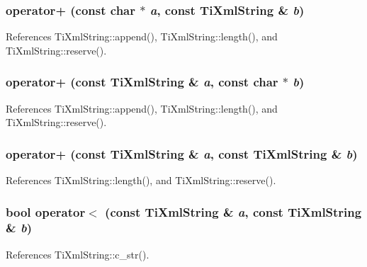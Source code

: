\subsubsection[operator+]{ operator+ (const char $\ast$ {\em a}, \/  const {\bf TiXmlString} \& {\em b})}\label{tinystr_8h_c0f2988a051a761664d80de81462fc4d}




References TiXmlString::append(), TiXmlString::length(), and TiXmlString::reserve().
\subsubsection[operator+]{ operator+ (const {\bf TiXmlString} \& {\em a}, \/  const char $\ast$ {\em b})}\label{tinystr_8h_b77ef9617d62643b24e52118db159b7b}




References TiXmlString::append(), TiXmlString::length(), and TiXmlString::reserve().
\subsubsection[operator+]{ operator+ (const {\bf TiXmlString} \& {\em a}, \/  const {\bf TiXmlString} \& {\em b})}\label{tinystr_8h_6ee35bce93b3aaf8a2353471c0dd2d58}




References TiXmlString::length(), and TiXmlString::reserve().
\subsubsection[operator$<$]{\setlength{\rightskip}{0pt plus 5cm}bool operator$<$ (const {\bf TiXmlString} \& {\em a}, \/  const {\bf TiXmlString} \& {\em b})\hspace{0.3cm}{\tt  [inline]}}\label{tinystr_8h_28e13086a32670328b9f4fac22f09ccb}




References TiXmlString::c\_\-str().
